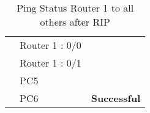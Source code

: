 \documentclass[a4paper,11pt]{article}
\begin{document}
\begin{enumerate}
\begin{table}[H]
\begin{tabular}{| m{10em}| m{10em}| m{10em} |}
                  \hhline{|>{\arrayrulecolor[rgb]{0.141,0.525,1}}->{\arrayrulecolor{black}}->{\arrayrulecolor[rgb]{0.42,0.988,0.827}}->{\arrayrulecolor{black}}|}
                  {\cellcolor[rgb]{0.141,0.525,1}}                                     & Router 1 : 0/0       & {\cellcolor[rgb]{0.42,0.988,0.827}}                                        \\
                  \hhline{|>{\arrayrulecolor[rgb]{0.141,0.525,1}}->{\arrayrulecolor{black}}->{\arrayrulecolor[rgb]{0.42,0.988,0.827}}->{\arrayrulecolor{black}}|}
                  {\cellcolor[rgb]{0.141,0.525,1}}                                     & Router 1 : 0/1       & {\cellcolor[rgb]{0.42,0.988,0.827}}                                        \\
                  \hhline{|>{\arrayrulecolor[rgb]{0.141,0.525,1}}->{\arrayrulecolor{black}}->{\arrayrulecolor[rgb]{0.42,0.988,0.827}}->{\arrayrulecolor{black}}|}
                  {\cellcolor[rgb]{0.141,0.525,1}}                                     & PC5                  & {\cellcolor[rgb]{0.42,0.988,0.827}}                                        \\
                  \hhline{|>{\arrayrulecolor[rgb]{0.141,0.525,1}}->{\arrayrulecolor{black}}->{\arrayrulecolor[rgb]{0.42,0.988,0.827}}->{\arrayrulecolor{black}}|}
                  \multirow{-10}{*}{{\cellcolor[rgb]{0.141,0.525,1}}\textbf{Router 1}} & PC6                  & \multirow{-10}{*}{{\cellcolor[rgb]{0.42,0.988,0.827}} \textbf{Successful}} \\
                  \hline
              \end{tabular}
              \caption{ Ping Status Router 1 to all others after RIP}
          \end{table}




          \begin{table}[H]
              \centering


\end{table}
\end{enumerate}
\end{document}
